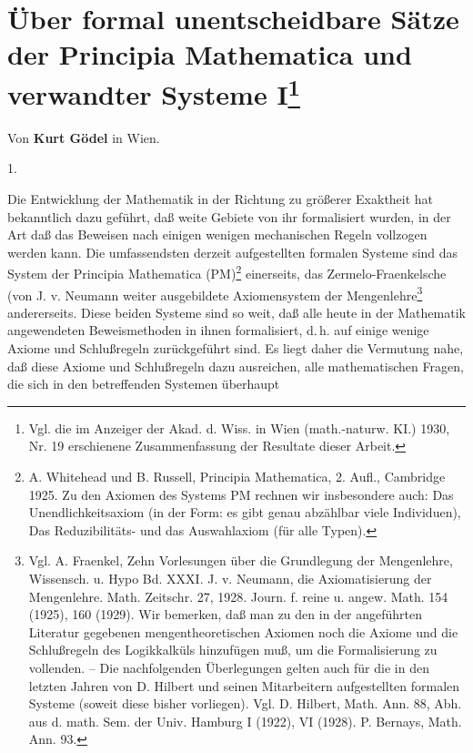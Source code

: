 \documentclass{scrartcl}
\begin{document}
\section{Über formal unentscheidbare Sätze der Principia Mathematica und verwandter Systeme I\protect\footnote{Vgl. die im Anzeiger der Akad. d. Wiss. in Wien (math.-naturw. KI.) 1930, Nr. 19 erschienene Zusammenfassung der Resultate dieser Arbeit.}}

\begin{center}
Von \textbf{Kurt Gödel} in Wien.
\end{center}

\begin{center}
1.
\end{center}

Die Entwicklung der Mathematik in der Richtung zu größerer
Exaktheit hat bekanntlich dazu geführt, daß weite Gebiete
von ihr formalisiert wurden, in der Art daß das Beweisen
nach einigen wenigen mechanischen Regeln vollzogen werden
kann. Die umfassendsten derzeit aufgestellten formalen 
Systeme sind das System der Principia Mathematica 
(PM)\footnote{A. Whitehead und B. Russell, Principia
Mathematica, 2. Aufl., Cambridge 1925. Zu den Axiomen 
des Systems PM rechnen wir insbesondere auch: 
Das Unendlichkeitsaxiom (in der Form: es gibt 
genau abzählbar viele Individuen), 
Das Reduzibilitäts- und das Auswahlaxiom (für alle 
Typen).} einerseits, das Zermelo-Fraenkelsche
(von J. v. Neumann weiter ausgebildete Axiomensystem
der Mengenlehre\footnote{Vgl. A. Fraenkel, Zehn
Vorlesungen über die Grundlegung der Mengenlehre,
Wissensch. u. Hypo Bd. XXXI. J. v. Neumann, die
Axiomatisierung der Mengenlehre. Math. Zeitschr. 27, 
1928. Journ. f. reine u. angew. Math. 154 (1925), 
160 (1929). Wir bemerken, daß man zu den in der
angeführten Literatur gegebenen mengentheoretischen
Axiomen noch die Axiome und die Schlußregeln des
Logikkalküls hinzufügen muß, um die Formalisierung 
zu vollenden. -- Die nachfolgenden Überlegungen gelten
auch für die in den letzten Jahren von D. Hilbert und
seinen Mitarbeitern aufgestellten formalen Systeme 
(soweit diese bisher vorliegen). Vgl. D. Hilbert,
Math. Ann. 88, Abh. aus d. math. Sem. der Univ. 
Hamburg I (1922), VI (1928). P. Bernays, Math. Ann. 93.} 
andererseits. Diese beiden Systeme sind so weit, daß 
alle heute in der Mathematik angewendeten 
Beweismethoden in ihnen formalisiert, d.\,h. auf
einige wenige Axiome und Schlußregeln zurückgeführt sind.
Es liegt daher die Vermutung nahe, daß diese Axiome
und Schlußregeln dazu ausreichen, alle mathematischen
Fragen, die sich in den betreffenden Systemen überhaupt
\end{document}
